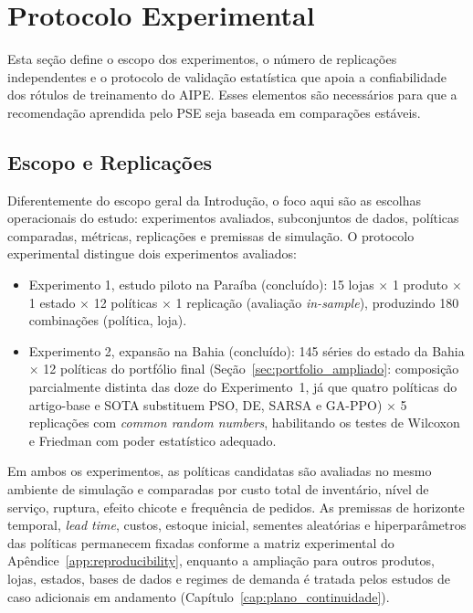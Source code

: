 \section{Protocolo Experimental}
\label{sec:protocolo_exp}

Esta seção define o escopo dos experimentos, o número de replicações independentes e o protocolo de validação estatística que apoia a confiabilidade dos rótulos de treinamento do AIPE. Esses elementos são necessários para que a recomendação aprendida pelo PSE seja baseada em comparações estáveis.

\subsection{Escopo e Replicações}

Diferentemente do escopo geral da Introdução, o foco aqui são as escolhas operacionais do estudo: experimentos avaliados, subconjuntos de dados, políticas comparadas, métricas, replicações e premissas de simulação. O protocolo experimental distingue dois experimentos avaliados:

\begin{itemize}
  \item Experimento 1, estudo piloto na Paraíba (concluído): 15 lojas $\times$ 1 produto $\times$ 1 estado $\times$ 12 políticas $\times$ 1 replicação (avaliação \textit{in-sample}), produzindo 180 combinações (política, loja).
  \item Experimento 2, expansão na Bahia (concluído): 145 séries do estado da Bahia $\times$ 12 políticas do portfólio final (Seção~\ref{sec:portfolio_ampliado}: composição parcialmente distinta das doze do Experimento~1, já que quatro políticas do artigo-base e SOTA substituem PSO, DE, SARSA e GA-PPO) $\times$ 5 replicações com \textit{common random numbers}, habilitando os testes de Wilcoxon e Friedman com poder estatístico adequado.
\end{itemize}

Em ambos os experimentos, as políticas candidatas são avaliadas no mesmo ambiente de simulação e comparadas por custo total de inventário, nível de serviço, ruptura, efeito chicote e frequência de pedidos. As premissas de horizonte temporal, \textit{lead time}, custos, estoque inicial, sementes aleatórias e hiperparâmetros das políticas permanecem fixadas conforme a matriz experimental do Apêndice~\ref{app:reproducibility}, enquanto a ampliação para outros produtos, lojas, estados, bases de dados e regimes de demanda é tratada pelos estudos de caso adicionais em andamento (Capítulo~\ref{cap:plano_continuidade}).


